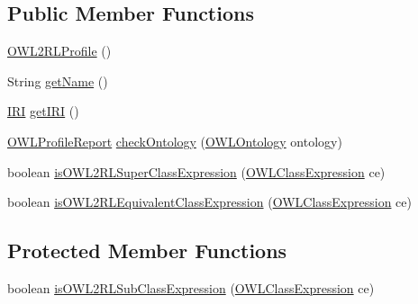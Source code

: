 \subsection*{Public Member Functions}
\begin{DoxyCompactItemize}
\item 
\hyperlink{classorg_1_1semanticweb_1_1owlapi_1_1profiles_1_1_o_w_l2_r_l_profile_a1104b929c1a23036dc6b493dc5873288}{O\-W\-L2\-R\-L\-Profile} ()
\item 
String \hyperlink{classorg_1_1semanticweb_1_1owlapi_1_1profiles_1_1_o_w_l2_r_l_profile_ab055a1d674db75521c8d7f147f26f3b7}{get\-Name} ()
\item 
\hyperlink{classorg_1_1semanticweb_1_1owlapi_1_1model_1_1_i_r_i}{I\-R\-I} \hyperlink{classorg_1_1semanticweb_1_1owlapi_1_1profiles_1_1_o_w_l2_r_l_profile_a303a0cf51b62c6e851177f3858f186c9}{get\-I\-R\-I} ()
\item 
\hyperlink{classorg_1_1semanticweb_1_1owlapi_1_1profiles_1_1_o_w_l_profile_report}{O\-W\-L\-Profile\-Report} \hyperlink{classorg_1_1semanticweb_1_1owlapi_1_1profiles_1_1_o_w_l2_r_l_profile_a19776b794029c2eb7d5e10a206ea5989}{check\-Ontology} (\hyperlink{interfaceorg_1_1semanticweb_1_1owlapi_1_1model_1_1_o_w_l_ontology}{O\-W\-L\-Ontology} ontology)
\item 
boolean \hyperlink{classorg_1_1semanticweb_1_1owlapi_1_1profiles_1_1_o_w_l2_r_l_profile_a76f0236f37eb5b7f272d01f8077c3aaa}{is\-O\-W\-L2\-R\-L\-Super\-Class\-Expression} (\hyperlink{interfaceorg_1_1semanticweb_1_1owlapi_1_1model_1_1_o_w_l_class_expression}{O\-W\-L\-Class\-Expression} ce)
\item 
boolean \hyperlink{classorg_1_1semanticweb_1_1owlapi_1_1profiles_1_1_o_w_l2_r_l_profile_a85ed091cad498cc0317673980e2a1368}{is\-O\-W\-L2\-R\-L\-Equivalent\-Class\-Expression} (\hyperlink{interfaceorg_1_1semanticweb_1_1owlapi_1_1model_1_1_o_w_l_class_expression}{O\-W\-L\-Class\-Expression} ce)
\end{DoxyCompactItemize}
\subsection*{Protected Member Functions}
\begin{DoxyCompactItemize}
\item 
boolean \hyperlink{classorg_1_1semanticweb_1_1owlapi_1_1profiles_1_1_o_w_l2_r_l_profile_a67b64c58fd492ef4006ce84d4f9b7348}{is\-O\-W\-L2\-R\-L\-Sub\-Class\-Expression} (\hyperlink{interfaceorg_1_1semanticweb_1_1owlapi_1_1model_1_1_o_w_l_class_expression}{O\-W\-L\-Class\-Expression} ce)
\end{DoxyCompactItemize}
